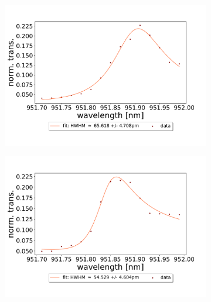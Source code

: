 \begin{figure}[h!]
\begin{subfigure}[b]{0.49\textwidth}
        \includegraphics[width=\textwidth]{figures/results/double fano fits/320um_M3:M5_fit_3.pdf}
        \caption{}
        \label{fig:320um_M3:M5_fit_3}
    \end{subfigure}
    \begin{subfigure}[b]{0.49\textwidth}
        \includegraphics[width=\textwidth]{figures/results/double fano fits/320um_M3:M5_fit_4.pdf}
        \caption{}
        \label{fig:320um_M3:M5_fit_4}
    \end{subfigure}
    \begin{subfigure}[b]{0.49\textwidth}

\end{subfigure}
\end{figure}
